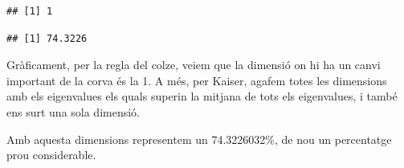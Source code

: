 \documentclass[
]{article}
\newenvironment{Shaded}{\begin{snugshade}}{\end{snugshade}}
\newcommand{\AttributeTok}[1]{\textcolor[rgb]{0.77,0.63,0.00}{#1}}
\newcommand{\CommentTok}[1]{\textcolor[rgb]{0.56,0.35,0.01}{\textit{#1}}}
\newcommand{\DecValTok}[1]{\textcolor[rgb]{0.00,0.00,0.81}{#1}}
\newcommand{\FloatTok}[1]{\textcolor[rgb]{0.00,0.00,0.81}{#1}}
\newcommand{\FunctionTok}[1]{\textcolor[rgb]{0.00,0.00,0.00}{#1}}
\newcommand{\NormalTok}[1]{#1}
\newcommand{\OtherTok}[1]{\textcolor[rgb]{0.56,0.35,0.01}{#1}}
\newcommand{\SpecialCharTok}[1]{\textcolor[rgb]{0.00,0.00,0.00}{#1}}
\newcommand{\StringTok}[1]{\textcolor[rgb]{0.31,0.60,0.02}{#1}}
\begin{document}
\begin{Shaded}
\end{Shaded}

\begin{verbatim}
## [1] 1
\end{verbatim}

\begin{Shaded}
\end{Shaded}

\begin{verbatim}
## [1] 74.3226
\end{verbatim}

Gràficament, per la regla del colze, veiem que la dimensió on hi ha un
canvi important de la corva és la 1. A més, per Kaiser, agafem totes les
dimensions amb els eigenvalues els quals superin la mitjana de tots els
eigenvalues, i també ens surt una sola dimensió.

Amb aquesta dimensions representem un 74.3226032\%, de nou un
percentatge prou considerable.

\begin{Shaded}
\end{Shaded}
\end{document}
